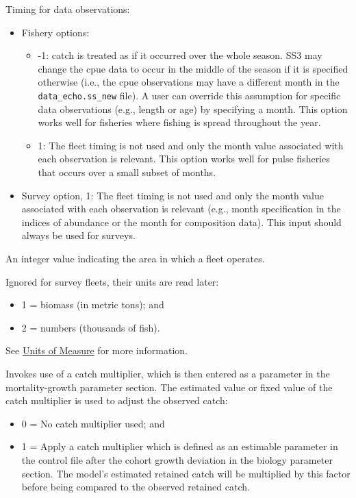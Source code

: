\hypertarget{ObsTiming}{}
   Timing for data observations:
	  \begin{itemize}
	  	\item Fishery options:
		\begin{itemize}
		    \item -1: catch is treated as if it occurred over the whole season. SS3 may change the \gls{cpue} data to occur in the middle of the season if it is specified otherwise (i.e., the \gls{cpue} observations may have a different month in the \texttt{data\_echo.ss\_new} file). A user can override this assumption for specific data observations (e.g., length or age) by specifying a month. This option works well for fisheries where fishing is spread throughout the year.
			\item 1: The fleet timing is not used and only the month value associated with each observation is relevant. This option works well for pulse fisheries that occurs over a small subset of months.
		\end{itemize}
	  	\item Survey option, 1: The fleet timing is not used and only the month value associated with each observation is relevant (e.g., month specification in the indices of abundance or the month for composition data). This input should always be used for surveys.
	  \end{itemize}	  
	  
An integer value indicating the area in which a fleet operates.

  Ignored for survey fleets, their units are read later:
	  \begin{itemize}
	  	\item 1 = biomass (in metric tons); and
	  	\item 2 = numbers (thousands of fish).
	  \end{itemize}   
  See \hyperlink{UnitsOfMeasure}{Units of Measure} for more information.

\hypertarget{CatchMult}{}
Invokes use of a catch multiplier, which is then entered as a parameter in the mortality-growth parameter section. The estimated value or fixed value of the catch multiplier is used to adjust the observed catch:
	  \begin{itemize}
	  	\item 0 = No catch multiplier used; and
	  	\item 1 = Apply a catch multiplier which is defined as an estimable parameter in the control file after the cohort growth deviation in the biology parameter section. The model's estimated retained catch will be multiplied by this factor before being compared to the observed retained catch.
	  \end{itemize} 
	  
